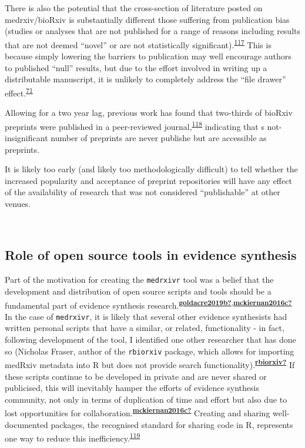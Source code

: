 \documentclass[a4paper, twoside]{templates/ociamthesis}
\begin{document}
There is also the potential that the cross-section of literature posted on medrxiv/bioRxiv is substantially different those suffering from publication bias (studies or analyses that are not published for a range of reasons including results that are not deemed ``novel'' or are not statistically significant).\textsuperscript{\protect\hyperlink{ref-song2010}{117}} This is because simply lowering the barriers to publication may well encourage authors to published ``null'' results, but due to the effort involved in writing up a distributable manuscript, it is unlikely to completely address the ``file drawer'' effect.\textsuperscript{\protect\hyperlink{ref-rosenthal1979}{71}}

Allowing for a two year lag, previous work has found that two-thirds of bioRxiv preprints were published in a peer-reviewed journal,\textsuperscript{\protect\hyperlink{ref-abdill2019b}{118}} indicating that s not-insignificant number of preprints are never publishe but are accessible as preprints.

It is likely too early (and likely too methodologically difficult) to tell whether the increased popularity and acceptance of preprint repositories will have any effect of the availability of research that was not considered ``publishable'' at other venues.

~

\hypertarget{role-of-open-source-tools-in-evidence-synthesis}{%
\subsection{Role of open source tools in evidence synthesis}\label{role-of-open-source-tools-in-evidence-synthesis}}

Part of the motivation for creating the \texttt{medrxivr} tool was a belief that the development and distribution of open source scripts and tools should be a fundamental part of evidence synthesis research.\textsuperscript{\protect\hyperlink{ref-goldacre2019b}{\textbf{goldacre2019b?}},\protect\hyperlink{ref-mckiernan2016c}{\textbf{mckiernan2016c?}}} In the case of \texttt{medrxivr}, it is likely that several other evidence synthesists had written personal scripts that have a similar, or related, functionality - in fact, following development of the tool, I identified one other researcher that has done so (Nicholas Fraser, author of the \texttt{rbiorxiv} package, which allows for importing medRxiv metadata into R but does not provide search functionality).\textsuperscript{\protect\hyperlink{ref-rbiorxiv}{\textbf{rbiorxiv?}}} If these scripts continue to be developed in private and are never shared or publicised, this will inevitably hamper the efforts of evidence synthesis community, not only in terms of duplication of time and effort but also due to lost opportunities for collaboration.\textsuperscript{\protect\hyperlink{ref-mckiernan2016c}{\textbf{mckiernan2016c?}}} Creating and sharing well-documented packages, the recognised standard for sharing code in R, represents one way to reduce this inefficiency.\textsuperscript{\protect\hyperlink{ref-vuorre2020}{119}}
\end{document}
